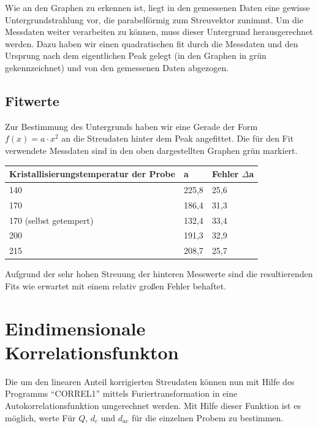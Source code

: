 \documentclass[bigchapter,colorback,accentcolor=tud4b,linedtoc,11pt]{tudreport}
\begin{document}
\FloatBarrier

Wie an den Graphen zu erkennen ist, liegt in den gemessenen Daten eine gewisse Untergrundstrahlung vor, die parabelförmig zum Streuvektor zunimmt. Um die Messdaten weiter verarbeiten zu können, muss dieser Untergrund herausgerechnet werden. Dazu haben wir einen quadratischen fit durch die Messdaten und den Ursprung nach dem eigentlichen Peak gelegt (in den Graphen in grün gekennzeichnet) und von den gemessenen Daten abgezogen.

\subsection{Fitwerte}
Zur Bestimmung des Untergrunds haben wir eine Gerade der Form $f(x) = a \cdot x^2$ an die Streudaten hinter dem Peak angefittet. Die für den Fit verwendete Messdaten sind in den oben dargestellten Graphen grün markiert.

\begin{center}
  \begin{tabular}{|p{7cm}|p{2.2cm}|p{2.2cm}|}
    \hline
    Kristallisierungstemperatur der Probe & a     & Fehler $\Delta$a  \\ \hline
    140                                   & 225,8 & 25,6              \\ \hline
    170                                   & 186,4 & 31,3              \\ \hline
    170 (selbst getempert)                & 132,4 & 33,4              \\ \hline
    200                                   & 191,3 & 32,9               \\ \hline
    215                                   & 208,7 & 25,7              \\ \hline
	\end{tabular}
\end{center}

Aufgrund der sehr hohen Streuung der hinteren Messwerte sind die resultierenden Fits wie erwartet mit einem relativ großen Fehler behaftet.


\section{Eindimensionale Korrelationsfunkton}
Die um den linearen Anteil korrigierten Streudaten können nun mit Hilfe des Programms "`CORREL1"' mittels Furiertransformation in eine Autokorrelationsfunktion umgerechnet werden. Mit Hilfe dieser Funktion ist es möglich, werte Für $Q$, $d_c$ und $d_{ac}$ für die einzelnen Probem zu bestimmen.
\end{document}
